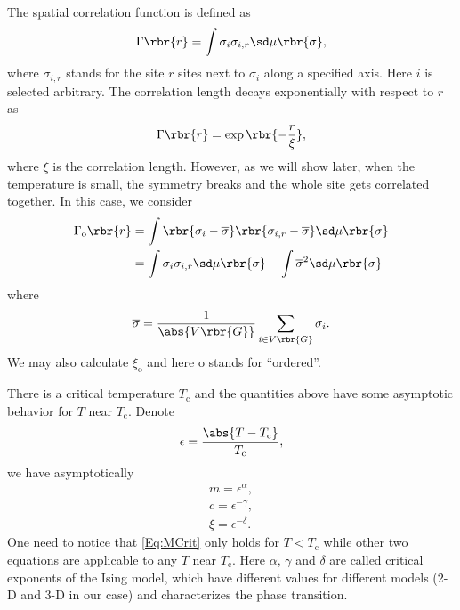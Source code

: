 \documentclass[english, nochinese]{pnote}
\begin{document}
The spatial correlation function is defined as
\begin{equation} \label{Eq:Corr}
\Gamma \rbr{r} = \int \sigma_i \sigma_{ i, r } \sd \mu \rbr{\sigma},
\end{equation}
where $ \sigma_{ i, r } $ stands for the site $r$ sites next to $\sigma_i$ along a specified axis. Here $i$ is selected arbitrary. The correlation length decays exponentially with respect to $r$ as
\begin{equation}
\Gamma \rbr{r} = \exp \rbr{-\frac{r}{\xi}},
\end{equation}
where $\xi$ is the correlation length. However, as we will show later, when the temperature is small, the symmetry breaks and the whole site gets correlated together. In this case, we consider
\begin{equation}
\begin{split}
\Gamma_{\text{o}} \rbr{r} &= \int \rbr{ \sigma_i - \overline{\sigma} } \rbr{ \sigma_{ i, r } - \overline{\sigma} } \sd \mu \rbr{\sigma} \\
&= \int \sigma_i \sigma_{ i, r } \sd \mu \rbr{\sigma} - \int \overline{\sigma}^2 \sd \mu \rbr{\sigma}
\end{split}
\end{equation}
where
\begin{equation}
\overline{\sigma} = \frac{1}{\abs{ V \rbr{G} }} \sum_{ i \in V \rbr{G} } \sigma_i.
\end{equation}
We may also calculate $\xi_{\text{o}}$ and here o stands for ``ordered''.

There is a critical temperature $T_{\text{c}}$ and the quantities above have some asymptotic behavior for $T$ near $T_{\text{c}}$. Denote
\begin{equation}
\epsilon = \frac{\abs{ T - T_{\text{c} }}}{T_{\text{c}}},
\end{equation}
we have asymptotically
\begin{gather}
\label{Eq:MCrit}
m = \epsilon^{\alpha}, \\
c = \epsilon^{-\gamma}, \\
\xi = \epsilon^{-\delta}.
\end{gather}
One need to notice that \eqref{Eq:MCrit} only holds for $ T < T_{\text{c}} $ while other two equations are applicable to any $T$ near $T_{\text{c}}$. Here $\alpha$, $\gamma$ and $\delta$ are called critical exponents of the Ising model, which have different values for different models (2-D and 3-D in our case) and characterizes the phase transition.
\end{document}
